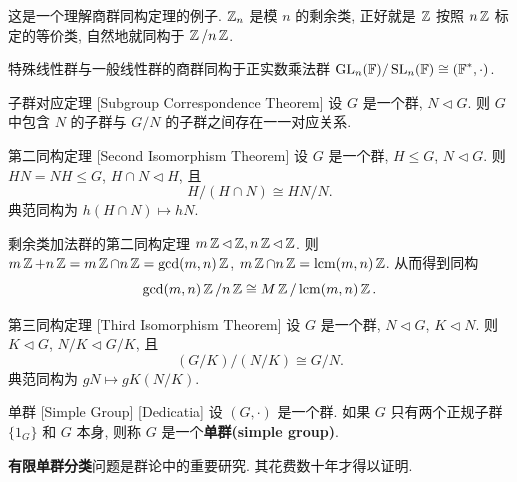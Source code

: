         \begin{rmk}
            [Dedicatia]
            这是一个理解商群同构定理的例子. \(\operatorname{\mathbb{Z}}_n\) 是模 \(n\) 的剩余类, 正好就是 \(\operatorname{\mathbb{Z}}\) 按照 \(n\operatorname{\mathbb{Z}}\) 标定的等价类, 自然地就同构于 \(\operatorname{\mathbb{Z}}/n\operatorname{\mathbb{Z}}\).
        \end{rmk}

        \begin{ins}
            {特殊线性群与一般线性群的商群同构于正实数乘法群}
            \(\operatorname{GL}_n(\operatorname{\mathbb{F}})/\operatorname{SL}_n(\operatorname{\mathbb{F}})\cong (\operatorname{\mathbb{F}}^*, \cdot)\).
        \end{ins}

        \begin{crl}
            [SubgroupCorrespondence]
            {子群对应定理}
            [Subgroup Correspondence Theorem]
            设 \(G\) 是一个群, \(N\lhd G\). 则 \(G\) 中包含 \(N\) 的子群与 \(G/N\) 的子群之间存在一一对应关系. 
        \end{crl}

        \begin{crl}
            [SecondIsom]
            {第二同构定理}
            [Second Isomorphism Theorem]
            设 \(G\) 是一个群, \(H\leq G\), \(N\lhd G\). 则 \(HN=NH\leq G\), \(H\cap N\lhd H\), 且
            \[H/(H\cap N)\cong HN/N.\]
            典范同构为 \(h(H\cap N)\mapsto hN\).
        \end{crl}

        \begin{ins}
            {剩余类加法群的第二同构定理}
            \(m\operatorname{\mathbb{Z}}\lhd\operatorname{\mathbb{Z}}, n\operatorname{\mathbb{Z}}\lhd\operatorname{\mathbb{Z}}\). 则 \(m\operatorname{\mathbb{Z}}+n\operatorname{\mathbb{Z}}=m\operatorname{\mathbb{Z}}\cap n\operatorname{\mathbb{Z}}=\gcd(m,n)\operatorname{\mathbb{Z}}\), \(m\operatorname{\mathbb{Z}}\cap n\operatorname{\mathbb{Z}}=\operatorname{lcm}(m,n)\operatorname{\mathbb{Z}}\). 从而得到同构
            \[\gcd(m,n)\operatorname{\mathbb{Z}} / n\operatorname{\mathbb{Z}} \cong M\operatorname{\mathbb{Z}}/ \operatorname{lcm}(m,n)\operatorname{\mathbb{Z}} .\]
        \end{ins}

        \begin{crl}
            [ThirdIsom]
            {第三同构定理}
            [Third Isomorphism Theorem]
            设 \(G\) 是一个群, \(N\lhd G\), \(K\lhd N\). 则 \(K\lhd G\), \(N/K\lhd G/K\), 且
            \[(G/K)/(N/K)\cong G/N.\]
            典范同构为 \(gN\mapsto gK(N/K)\).
        \end{crl}

        \begin{dfn}
            {单群}
            [Simple Group]
            [Dedicatia]
            设 \((G,\cdot)\) 是一个群. 如果 \(G\) 只有两个正规子群 \(\{1_G\}\) 和 \(G\) 本身, 则称 \(G\) 是一个\textbf{单群(simple group)}.
        \end{dfn}

        \begin{rmk}
            [Dedicatia]
            \textbf{有限单群分类}问题是群论中的重要研究. 其花费数十年才得以证明. 
        \end{rmk}

